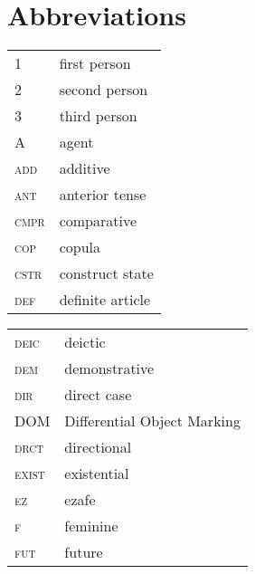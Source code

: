 \documentclass[output=paper,colorlinks,citecolor=brown,draftmode]{langscibook}
\begin{document}
\section*{Abbreviations}
\begin{tabularx}{.45\textwidth}{@{}lQ@{}}
1 & first person \\
2 & second person \\
3 & third person \\
A & agent \\
\textsc{add} & additive \\
\textsc{ant} & anterior tense \\
\textsc{cmpr} & comparative \\
\textsc{cop} & {copula} \\
\textsc{cstr} & construct state \\
\textsc{def} & definite article \\
\end{tabularx}%
\begin{tabularx}{.45\textwidth}{@{}lQ@{}}
\textsc{deic} & deictic \\
\textsc{dem} & demonstrative \\
\textsc{dir} & direct case \\
{DOM} & Differential Object Marking \\
\textsc{drct} & directional \\
\textsc{exist} & existential \\
\textsc{ez} & ezafe \\
\textsc{f} & feminine \\
\textsc{fut} & future \\
\end{tabularx}%
\end{document}
